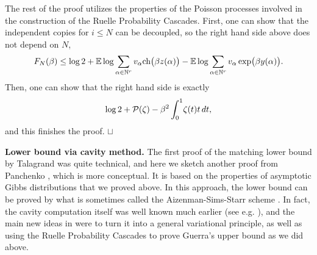 \documentclass[12pt]{article}
\newcommand{\PP}{{\cal P}}
\newcommand{\ch}{{\mbox{\rm ch}}}
\newcommand{\e}{\mathbb{E}}
\newcommand{\Natural}{\mathbb{N}}
\newcommand\qed{\hfill\hbox{\rlap{$\sqcap$}$\sqcup$}}
\theoremstyle{nonumberplain}
\begin{document}
The rest of the proof utilizes the properties of the Poisson processes involved in the construction of the Ruelle Probability Cascades. First, one can show that the independent copies for $i\leq N$ can be decoupled, so the right hand side above does not depend on $N$,
\begin{equation}
F_N(\beta)
\leq
\log 2 + \e\log \sum_{\alpha\in\Natural^r} v_{\alpha} \ch\bigl(\beta z(\alpha) \bigr)
-
\e\log \sum_{\alpha\in\Natural^r} v_{\alpha} \exp \bigl(\beta y(\alpha) \bigr).
\label{ch12AS2reprprelim}
\end{equation}
Then, one can show that the right hand side is exactly 
$$
\log 2 + \PP(\zeta) - {\beta^2}\int_{0}^{1}\! \zeta(t)t\, dt,
$$
and this finishes the proof.
\qed


\medskip
\noindent
\textbf{Lower bound via cavity method.} The first proof of the matching lower bound by Talagrand \cite{TPF} was quite technical, and here we sketch another proof from Panchenko \cite{PPF}, which is more conceptual. It is based on the properties of asymptotic Gibbs distributions that we proved above. In this approach, the lower bound can be proved by what is sometimes called the Aizenman-Sims-Starr scheme \cite{AS2}. In fact, the cavity computation itself was well known much earlier (see e.g. \cite{Guerra95}), and the main new ideas in \cite{AS2} were to turn it into a general variational principle, as well as using the Ruelle Probability Cascades to prove Guerra's upper bound as we did above.
\end{document}
